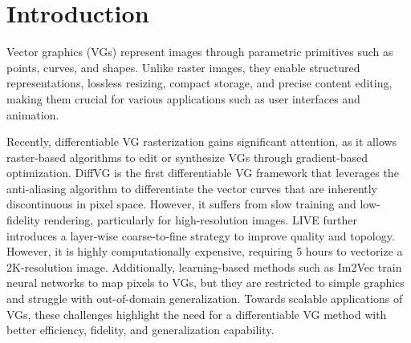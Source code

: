 \vspace{-1em}

\section{Introduction}
\label{sec:intro}
\vspace{-.5em}

Vector graphics (VGs) represent images through parametric primitives such as points, curves, and shapes. Unlike raster images, they enable structured representations, lossless resizing, compact storage, and precise content editing, making them crucial for various applications such as user interfaces and animation. 

Recently, differentiable VG rasterization gains significant attention, as it allows raster-based algorithms to edit or synthesize VGs through gradient-based optimization. DiffVG \cite{Li:2020:DVG} is the first differentiable VG framework that leverages the anti-aliasing algorithm to differentiate the vector curves that are inherently discontinuous in pixel space. However, it suffers from slow training and low-fidelity rendering, particularly for high-resolution images. LIVE \cite{xu2022live} further introduces a layer-wise coarse-to-fine strategy to improve quality and topology. However, it is highly computationally expensive, requiring 5 hours to vectorize a 2K-resolution image. Additionally, learning-based methods such as Im2Vec \cite{reddy2021im2vec} train neural networks to map pixels to VGs, but they are restricted to simple graphics and struggle with out-of-domain generalization. Towards scalable applications of VGs, these challenges highlight the need for a differentiable VG method with better efficiency, fidelity, and generalization capability. 

